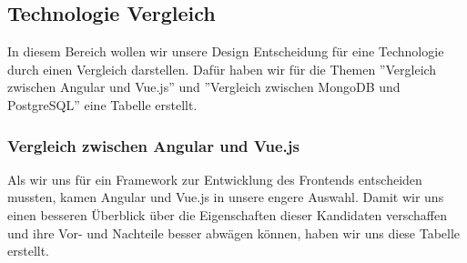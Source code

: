 \subsection{Technologie Vergleich}
In diesem Bereich wollen wir unsere Design Entscheidung für eine Technologie durch einen Vergleich darstellen.
Dafür haben wir für die Themen ''Vergleich zwischen Angular und Vue.js'' und ''Vergleich zwischen MongoDB und PostgreSQL'' eine Tabelle erstellt.

\subsubsection{Vergleich zwischen Angular und Vue.js}

Als wir uns für ein Framework zur Entwicklung des Frontends entscheiden mussten, kamen Angular und Vue.js in unsere engere Auswahl.
Damit wir uns einen besseren Überblick über die Eigenschaften dieser Kandidaten verschaffen und ihre Vor- und Nachteile besser abwägen können, 
haben wir uns diese Tabelle erstellt.

